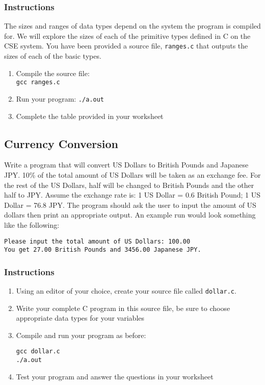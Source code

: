 \documentclass[12pt]{scrartcl}
\begin{document}
\subsubsection*{Instructions}

The sizes and ranges of data types depend on the system the program is
compiled for.  We will explore the sizes of each of the primitive types defined
in C on the CSE system.  You have been provided a source file,
\texttt{ranges.c} that outputs the sizes of each of the basic types.

\begin{enumerate}
  \item Compile the source file:\\
  	\texttt{gcc ranges.c}
  \item Run your program:
  	\texttt{./a.out}
  \item Complete the table provided in your worksheet
 \end{enumerate}

\subsection{Currency Conversion}

Write a program that will convert US Dollars to British Pounds and
Japanese JPY.  10\% of the total amount of US Dollars will be taken
as an exchange fee.  For the rest of the US Dollars, half will be
changed to British Pounds and the other half to JPY.  Assume the
exchange rate is: 1 US Dollar = 0.6 British Pound; 1 US Dollar =
76.8 JPY.  The program should ask the user to input the amount
of US dollars then print an appropriate output.  An example run
would look something like the following:

\begin{verbatim}
Please input the total amount of US Dollars: 100.00
You get 27.00 British Pounds and 3456.00 Japanese JPY.
\end{verbatim}

\subsubsection*{Instructions}

\begin{enumerate}
  \item Using an editor of your choice, create your source file
	called \texttt{dollar.c}.
  \item Write your complete C program in this source file, be sure
  	to choose appropriate data types for your variables
  \item Compile and run your program as before:

\begin{verbatim}
gcc dollar.c
./a.out
\end{verbatim}
  \item Test your program and answer the questions in your worksheet
\end{enumerate}
\end{document}
